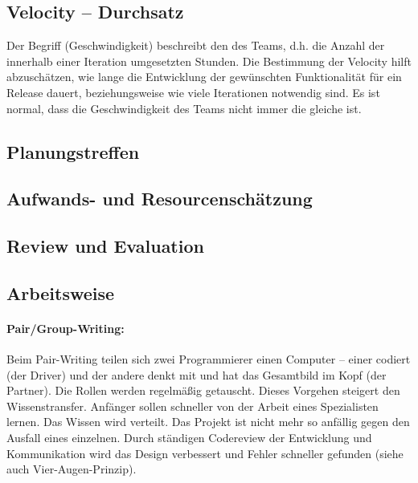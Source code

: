\documentclass[fontsize=9pt,paper=a4,parskip=half,DIV=11,twocolumn]{scrartcl}
\begin{document}
\subsection{Velocity -- Durchsatz}

Der Begriff  (Geschwindigkeit) beschreibt den  des
Teams, d.h. die Anzahl der innerhalb einer Iteration umgesetzten Stunden.
Die Bestimmung der Velocity hilft abzuschätzen, wie lange die Entwicklung  der
gewünschten Funktionalität für ein Release dauert, beziehungsweise wie viele Iterationen
notwendig sind. Es ist normal, dass die Geschwindigkeit des Teams nicht immer die
gleiche ist.










\subsection{Planungstreffen}

\subsection{Aufwands- und Resourcenschätzung}

\subsection{Review und Evaluation}

\subsection{Arbeitsweise}

\paragraph{Pair/Group-Writing:} Beim Pair-Writing teilen sich zwei
Programmierer einen Computer – einer codiert (der Driver) und der andere denkt mit und hat das
Gesamtbild im Kopf (der Partner). Die Rollen werden regelmäßig getauscht. Dieses
Vorgehen steigert den Wissenstransfer. Anfänger sollen schneller von der Arbeit
eines Spezialisten lernen. Das Wissen wird verteilt. Das Projekt ist nicht mehr
so anfällig gegen den Ausfall eines einzelnen. Durch ständigen Codereview der
Entwicklung und Kommunikation wird das Design verbessert und Fehler schneller
gefunden (siehe auch Vier-Augen-Prinzip).
\end{document}
